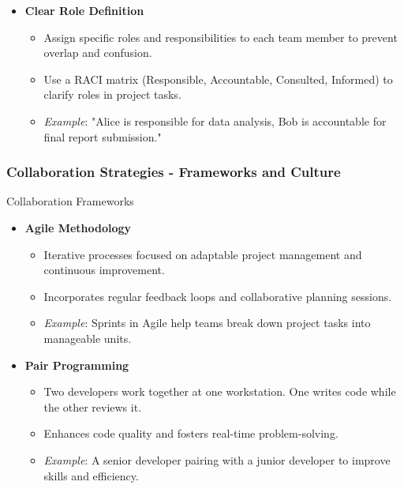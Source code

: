 \documentclass{beamer}
\begin{document}
\begin{frame}[fragile]
\begin{itemize}
        \item \textbf{Clear Role Definition}
            \begin{itemize}
                \item Assign specific roles and responsibilities to each team member to prevent overlap and confusion.
                \item Use a RACI matrix (Responsible, Accountable, Consulted, Informed) to clarify roles in project tasks.
                \item \textit{Example}: "Alice is responsible for data analysis, Bob is accountable for final report submission."
            \end{itemize}
    \end{itemize}
\end{frame}

\begin{frame}[fragile]
    \frametitle{Collaboration Strategies - Frameworks and Culture}
    \begin{block}{Collaboration Frameworks}
        \begin{itemize}
            \item \textbf{Agile Methodology}
                \begin{itemize}
                    \item Iterative processes focused on adaptable project management and continuous improvement.
                    \item Incorporates regular feedback loops and collaborative planning sessions.
                    \item \textit{Example}: Sprints in Agile help teams break down project tasks into manageable units.
                \end{itemize}

            \item \textbf{Pair Programming}
                \begin{itemize}
                    \item Two developers work together at one workstation. One writes code while the other reviews it.
                    \item Enhances code quality and fosters real-time problem-solving.
                    \item \textit{Example}: A senior developer pairing with a junior developer to improve skills and efficiency.
                \end{itemize}
        \end{itemize}
    \end{block}


\end{frame}
\end{document}
